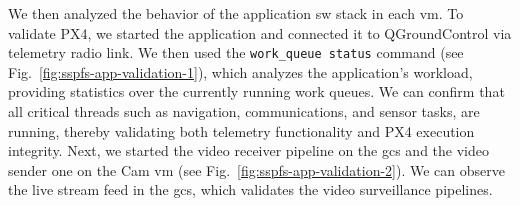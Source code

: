 We then analyzed the behavior of the application \gls{sw} stack in each
\gls{vm}.
To validate PX4, we started the application and connected it to QGroundControl
via telemetry radio link. We then used the \lstinline{work_queue status}
command (see Fig.~\ref{fig:sspfs-app-validation-1}), which analyzes the application's workload, providing statistics over
the currently running work queues. We can confirm that all critical threads such
as navigation, communications, and sensor tasks, are running, 
thereby validating both telemetry functionality and PX4 execution integrity.
%
Next, we started the video receiver pipeline on the \gls{gcs} and the video
sender one on the Cam \gls{vm} (see Fig.~\ref{fig:sspfs-app-validation-2}). We can
observe the live stream feed in the \gls{gcs}, which validates the video
surveillance pipelines.


